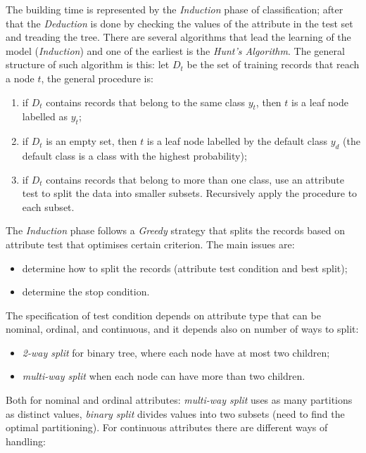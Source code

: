 The building time is represented by the \emph{Induction} phase of classification; after that the \emph{Deduction} is done by checking the values of the attribute in the test set and treading the tree.
There are several algorithms that lead the learning of the model (\emph{Induction}) and one of the earliest is the \emph{Hunt's Algorithm}.
The general structure of such algorithm is this: let $D_t$ be the set of training records that reach a node $t$, the general procedure is:
\begin{enumerate}
	\item if $D_t$ contains records that belong to the same class $y_t$, then $t$ is a leaf node labelled as $y_t$;
	\item if $D_t$ is an empty set, then $t$ is a leaf node labelled by the default class $y_d$ (the default class is a class with the highest probability);
	\item if $D_t$ contains records that belong to more than one class, use an attribute test to split the data into smaller subsets.
	Recursively apply the procedure to each subset.
\end{enumerate}
The \emph{Induction} phase follows a \emph{Greedy} strategy that splits the records based on attribute test that optimises certain criterion.
The main issues are:
\begin{itemize}
	\item
	determine how to split the records (attribute test condition and best split);
	\item
	determine the stop condition.
\end{itemize}
The specification of test condition depends on attribute type that can be nominal, ordinal, and continuous, and it depends also on number of ways to split:
\begin{itemize}
	\item
	\emph{2-way split} for binary tree, where each node have at most two children;
	\item
	\emph{multi-way split} when each node can have more than two children.
\end{itemize}
Both for nominal and ordinal attributes: \emph{multi-way split} uses as many partitions as distinct values, \emph{binary split} divides values into two subsets (need to find the optimal partitioning).
For continuous attributes there are different ways of handling:
